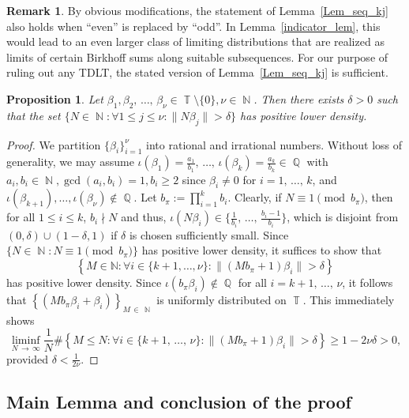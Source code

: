 \documentclass[10pt,a4paper]{amsart}
\numberwithin{equation}{section}
\DeclareMathOperator{\N}{\mathbb{N}}
\DeclareMathOperator{\Q}{\mathbb{Q}}
\DeclareMathOperator{\T}{\mathbb{T}}
\newcommand{\bbN}{\mathbb{N}}
\let\oldforall\forall
\renewcommand*{\forall}{\mathrel{\oldforall}}
\newtheorem{prop}[theo]{Proposition}
\theoremstyle{definition}
\newtheorem{rema}[theo]{Remark}
\begin{document}
\begin{rema}\label{Rem_evenoddIndices}
By obvious modifications, the statement of Lemma~\ref{Lem_seq_kj} also holds when ``even'' is replaced by ``odd''. In Lemma~\ref{indicator_lem}, this would lead to an even larger class of limiting distributions that are realized as limits of certain Birkhoff sums along suitable subsequences. For our purpose of ruling out any TDLT, the stated version of Lemma~\ref{Lem_seq_kj} is sufficient.
\end{rema}



\begin{prop}\label{isolated_density}
Let $\beta_1,\beta_2,\,\ldots,\,\beta_{\nu} \in \T \setminus \{0\}, \nu \in \N$. Then there exists $\delta> 0$ such that the set $\{N \in \N: \forall 1 \leq j \leq \nu: \| N\beta_j \| > \delta \}$ has positive lower density.
\end{prop}

\begin{proof}
We partition $\{ \beta_i \}_{i=1}^{\nu} $ into rational and irrational numbers. Without loss of generality, we may assume $\iota(\beta_1) = \frac{a_1}{b_1},\,\ldots,\,\iota(\beta_k) = \frac{a_k}{b_k} \in \Q$ with $a_i,b_i \in \N, \gcd(a_i,b_i) = 1, b_i \geq 2$ since $\beta_i \neq 0$ for $i = 1,\,\ldots,\,k$, and $\iota(\beta_{k+1}),\ldots,\iota(\beta_{\nu}) \notin \Q$. Let $b_{\pi} := \prod_{i=1}^{k}b_i$. Clearly, if $N \equiv 1 \pmod {b_{\pi}}$, then for all $1 \leq i \leq k$, $b_i \nmid N$ and thus, $\iota(N\beta_i) \in \{\frac{1}{b_i},\,\ldots,\,\tfrac{b_i-1}{b_i}\}$, which is disjoint from $(0,\delta) \cup (1-\delta,1)$ if $\delta$ is chosen sufficiently small. Since $\{N \in \N: N \equiv 1 \pmod{b_{\pi}}\}$ has positive lower density, it suffices to show that
\begin{equation*}
\left\{M \in \bbN: \forall i \in \{k+1,\ldots,\nu\}:
\| (M b_{\pi}+1)\beta_i \| > \delta \right\}
\end{equation*}
has positive lower density. Since $ \iota (b_{\pi} \beta_i) \notin \Q$ for all $i=k+1,\,\ldots,\,\nu$, it follows that $ \left \{ (M b_{\pi} \beta_i + \beta_i)\right\}_{M\,\in\,\N}$ is uniformly distributed on $\T$. This immediately shows
\[
\liminf_{N\,\to\,\infty}
\frac{1}{N}\#\left\{M \leq N: \forall i \in \{k+1,\,\ldots,\,\nu\}:
\| (M b_{\pi}+1)\beta_i \| > \delta \right\}
\geq 1 - 2\nu\delta > 0,
\]
provided $\delta < \frac{1}{2\nu}$.
\end{proof}

\subsection{Main Lemma and conclusion of the proof}\label{SubSec_proofThm}
\end{document}
